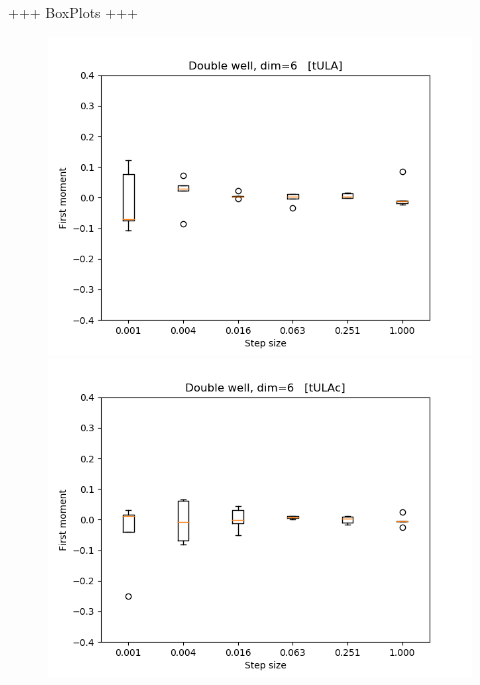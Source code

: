 +++ BoxPlots +++
\begin{figure}
\centering
  \begin{minipage}[b]{0.32\textwidth}
  \centering
    \includegraphics[width=\textwidth]{Figures/tula_fm.png}
  \end{minipage} %
  \begin{minipage}[b]{0.32\textwidth}
  \centering
    \includegraphics[width=\textwidth]{Figures/tulac_fm.png}
  \end{minipage} %
  \begin{minipage}[b]{0.32\textwidth}
  \centering

\end{minipage}
\end{figure}
